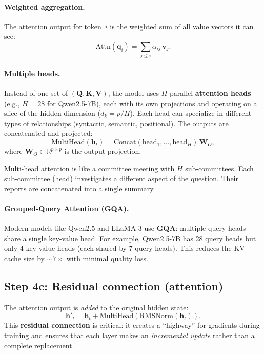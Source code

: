 \documentclass[11pt, twoside, openright]{memoir}
\begin{document}
\paragraph{Weighted aggregation.}  The attention output for token~$i$ is
the weighted sum of all value vectors it can see:
\[
  \text{Attn}(\mathbf{q}_i) = \sum_{j \leq i} \alpha_{ij} \, \mathbf{v}_j.
\]

\paragraph{Multiple heads.}  Instead of one set of $(\mathbf{Q}, \mathbf{K},
\mathbf{V})$, the model uses $H$ parallel \textbf{attention heads}
(e.g., $H = 28$ for Qwen2.5-7B), each with its own projections and operating
on a slice of the hidden dimension ($d_k = p / H$).  Each head can
specialize in different types of relationships (syntactic, semantic,
positional).  The outputs are concatenated and projected:
\[
  \text{MultiHead}(\mathbf{h}_t) =
  \text{Concat}(\text{head}_1, \ldots, \text{head}_H) \, \mathbf{W}_O,
\]
where $\mathbf{W}_O \in \mathbb{R}^{p \times p}$ is the output projection.

\begin{analogy}
Multi-head attention is like a committee meeting with $H$ sub-committees.
Each sub-committee (head) investigates a different aspect of the question.
Their reports are concatenated into a single summary.
\end{analogy}

\paragraph{Grouped-Query Attention (GQA).}  Modern models like Qwen2.5
and LLaMA-3 use \textbf{GQA}: multiple query heads share a single key-value
head.  For example, Qwen2.5-7B has 28 query heads but only 4 key-value
heads (each shared by 7 query heads).  This reduces the KV-cache size by
$\sim 7\times$ with minimal quality loss.

\subsection{Step 4c: Residual connection (attention)}

The attention output is \emph{added} to the original hidden state:
\[
  \mathbf{h}'_t = \mathbf{h}_t + \text{MultiHead}(\text{RMSNorm}(\mathbf{h}_t)).
\]
This \textbf{residual connection} is critical: it creates a ``highway'' for
gradients during training and ensures that each layer makes an
\emph{incremental update} rather than a complete replacement.
\end{document}
